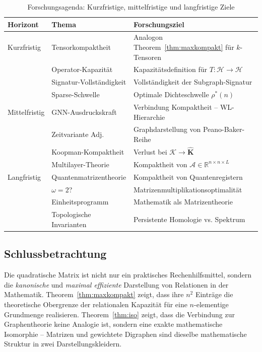 ﻿\documentclass[12pt, a4paper]{article}
\theoremstyle{definition}
\theoremstyle{remark}
\newcommand{\R}{\mathbb{R}}
\newcommand{\vK}{\bm{K}}
\begin{document}
\begin{table}[H]
\centering
\caption{Forschungsagenda: Kurzfristige, mittelfristige und langfristige Ziele}
\label{tab:agenda}
\begin{tabular}{>{\raggedright\arraybackslash}p{2.5cm}
                >{\raggedright\arraybackslash}p{5.0cm}
                >{\raggedright\arraybackslash}p{5.5cm}}
\toprule
\textbf{Horizont} & \textbf{Thema} & \textbf{Forschungsziel} \\
\midrule
Kurzfristig & Tensorkompaktheit & Analogon Theorem~\ref{thm:maxkompakt} für $k$-Tensoren \\
 & Operator-Kapazität & Kapazitätsdefinition für $T: \mathcal{H} \to \mathcal{H}$ \\
 & Signatur-Vollständigkeit & Vollständigkeit der Subgraph-Signatur \citep{epp2026subgraph} \\
 & Sparse-Schwelle & Optimale Dichteschwelle $\rho^*(n)$ \\
\midrule
Mittelfristig & GNN-Ausdruckskraft & Verbindung Kompaktheit -- WL-Hierarchie \\
 & Zeitvariante Adj. & Graphdarstellung von Peano-Baker-Reihe \\
 & Koopman-Kompaktheit & Verlust bei $\mathcal{K} \to \hat{\vK}$ \\
 & Multilayer-Theorie & Kompaktheit von $\mathcal{A} \in \R^{n \times n \times L}$ \\
\midrule
Langfristig & Quantenmatrizentheorie & Kompaktheit von Quantenregistern \\
 & $\omega = 2$? & Matrizenmultiplikationsoptimalität \\
 & Einheitsprogramm & Mathematik als Matrizentheorie \\
 & Topologische Invarianten & Persistente Homologie vs. Spektrum \\
\bottomrule
\end{tabular}
\end{table}

\subsection{Schlussbetrachtung}
\label{subsec:schluss}

Die quadratische Matrix ist nicht nur ein praktisches Rechenhilfsmittel,
sondern die \emph{kanonische} und \emph{maximal effiziente} Darstellung
von Relationen in der Mathematik. Theorem~\ref{thm:maxkompakt} zeigt,
dass ihre $n^2$ Einträge die theoretische Obergrenze der relationalen
Kapazität für eine $n$-elementige Grundmenge realisieren. Theorem~\ref{thm:iso}
zeigt, dass die Verbindung zur Graphentheorie keine Analogie ist, sondern
eine exakte mathematische Isomorphie -- Matrizen und gewichtete Digraphen
sind dieselbe mathematische Struktur in zwei Darstellungskleidern.
\end{document}
